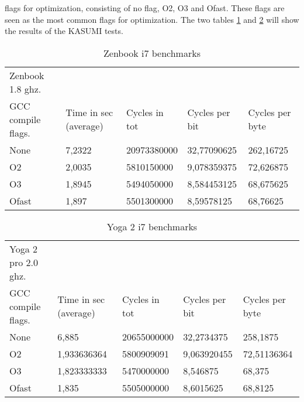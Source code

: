 flags for optimization, consisting of no flag, O2, O3 and Ofast. These
flags are seen as the most common flags for optimization. The two tables
\ref{tab:zen} and \ref{tab:yoga} will show the results of the KASUMI
tests.
\begin{table}[h!]
    \begin{tabular}{l|l|l|l|l}
     Zenbook 1.8 ghz.  & ~                     & ~             & ~              & ~               \\
    GCC compile flags. & Time in sec (average) & Cycles in tot & Cycles per bit & Cycles per byte \\ \hline
    None               & 7,2322                & 20973380000   & 32,77090625    & 262,16725       \\ \hline
    O2                 & 2,0035                & 5810150000    & 9,078359375    & 72,626875       \\ \hline
    O3                 & 1,8945                & 5494050000    & 8,584453125    & 68,675625       \\ \hline
    Ofast              & 1,897                 & 5501300000    & 8,59578125     & 68,76625        \\
    \end{tabular}
    \caption{Zenbook i7 benchmarks}
    \label{tab:zen}
\end{table}
\begin{table}[h!]
    \begin{tabular}{l|l|l|l|l}
     Yoga 2 pro 2.0 ghz. & ~                     & ~             & ~              & ~               \\
    GCC compile flags.   & Time in sec (average) & Cycles in tot & Cycles per bit & Cycles per byte \\ \hline
    None                 & 6,885                 & 20655000000   & 32,2734375     & 258,1875        \\ \hline
    O2                   & 1,933636364           & 5800909091    & 9,063920455    & 72,51136364     \\ \hline
    O3                   & 1,823333333           & 5470000000    & 8,546875       & 68,375          \\ \hline
    Ofast                & 1,835                 & 5505000000    & 8,6015625      & 68,8125         \\
    \end{tabular}
    \caption{Yoga 2 i7 benchmarks}
    \label{tab:yoga}
\end{table}\\


